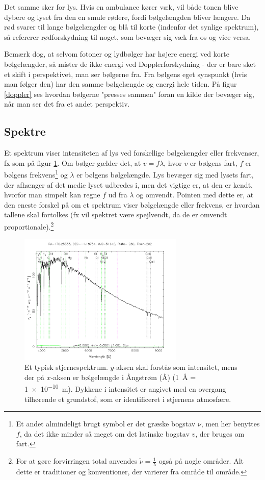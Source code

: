 Det samme sker for lys. Hvis en ambulance kører væk, vil både tonen blive dybere og lyset fra den en smule rødere, fordi bølgelængden bliver længere. Da rød svarer til lange bølgelængder og blå til korte (indenfor det synlige spektrum), så refererer rødforskydning til noget, som bevæger sig væk fra os og vice versa. 

Bemærk dog, at selvom fotoner og lydbølger har højere energi ved korte bølgelængder, så mister de ikke energi ved Dopplerforskydning - der er bare sket et skift i perspektivet, man ser bølgerne fra. Fra bølgens eget synspunkt (hvis man følger den) har den samme bølgelængde og energi hele tiden. På figur \ref{doppler} ses hvordan bølgerne "presses sammen" foran en kilde der bevæger sig, når man ser det fra et andet perspektiv.



\subsection{Spektre} \label{sec:spektrer}
Et spektrum viser intensiteten af lys ved forskellige bølgelængder eller frekvenser, fx som på figur \ref{spektrum}. Om bølger gælder det, at $v = f\lambda$, hvor $v$ er bølgens fart, $f$ er bølgens frekvens\footnote{Et andet almindeligt brugt symbol er det græske bogstav $\nu$, men her benyttes $f$, da det ikke minder så meget om det latinske bogstav $v$, der bruges om fart.} og $\lambda$ er bølgens bølgelængde. Lys bevæger sig med lysets fart, der afhænger af det medie lyset udbredes i, men det vigtige er, at den er kendt, hvorfor man simpelt kan regne $f$ ud fra $\lambda$ og omvendt. Pointen med dette er, at den eneste forskel på om et spektrum viser bølgelængde eller frekvens, er hvordan tallene skal fortolkes (fx vil spektret være spejlvendt, da de er omvendt proportionale).\footnote{For at gøre forvirringen total anvendes $\tilde{\nu} = \frac{1}{\lambda}$ også på nogle områder. Alt dette er traditioner og konventioner, der varierer fra område til område.} \\
\begin{figure}[h!]
	\centering
	\includegraphics[width=0.7\textwidth]{Astrofysik/billeder/spektrum.png}
	\caption{Et typisk stjernespektrum. $y$-aksen skal forstås som intensitet, mens der
		på $x$-aksen er bølgelængde i Ångstrøm (\si{\angstrom}) (\SI{1}{\angstrom} = \SI{1e-10}{\metre}). Dykkene i intensitet
		er angivet med en overgang tilhørende et grundstof, som er identificeret i stjernens
		atmosfære.}
	\label{spektrum}
\end{figure}

